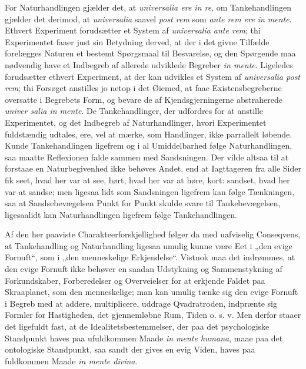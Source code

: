 \documentclass[11pt]{book}
\newcommand{\opage}[1]{\marginnote{\footnotesize\textit{[#1]}}}
\begin{document}
For Naturhandlingen gjælder det, at \textit{universalia ere in re}, om
Tankehandlingen gjælder det derimod, at \textit{universalia} saavel
\textit{post rem} som \textit{ante rem ere in mente}. Ethvert
Experiment forudsætter et System af \textit{universalia ante rem}; thi
Experimentet faaer just sin Betydning derved, at der i
\opage{212} \setcounter{footnote}{0}%
det givne Tilfælde forelægges Naturen et bestemt Spørgsmaal til
Besvarelse, og den Spørgende maa nødvendig have et Indbegreb af
allerede udviklede Begreber \textit{in mente}. Ligeledes forudsætter
ethvert Experiment, at der kan udvikles et System af
\textit{universalia post rem}; thi Forsøget anstilles jo netop i det
Øiemed, at faae Existensbegreberne oversatte i Begrebets Form, og
bevare de af Kjendsgjerningerne abstraherede \textit{univer\-%
salia in mente}. De Tankehandlinger, der udfordres for at anstille
Experimentet, og det Indbegreb af Naturhandlinger, hvori Experimentet
fuldstændig udtales, ere, vel at mærke, som Handlinger, ikke parrallelt
løbende.
Kunde Tankehandlingen ligefrem og i al Umiddelbarhed følge
Naturhandlingen, saa maatte Reflexionen falde sammen med Sandsningen.
Der vilde altsaa til at forstaae en Naturbegivenhed ikke behøves Andet,
end at Iagttageren fra alle Sider fik seet, hvad her var at see, hørt,
hvad her var at høre, kort: sandset, hvad her var at sandse; men
ligesaa lidt som Sandsningen ligefrem kan følge Tænkningen, saa at
Sandsebevægelsen Punkt for Punkt skulde svare til Tankebevægelsen,
ligesaalidt kan Naturhandlingen ligefrem følge Tankehandlingen.

Af den her paaviste Charakteerforskjellighed følger da med uafviselig
Conseqvens, at Tankehandling og Naturhandling ligesaa umulig kunne være
Eet i „den evige Fornuft“, som i „den menneskelige Erkjendelse“.
Vistnok maa det indrømmes, at den evige Fornuft ikke behøver en saadan
Udstykning og Sammenstykning af Forkundskaber, Forberedelser og
Overveielser for at erkjende Faldet paa Skraaplanet, som den
menneskelige; man kan umulig tænke sig den evige Fornuft i Begreb med
at addere, multiplicere, uddrage Qvadratroden, indprænte sig Formler
for Hastigheden, det gjennemløbne Rum, Tiden o. s. v. Men derfor staaer
det ligefuldt fast, at de Idealitetsbestemmelser, der paa det
psychologiske Standpunkt haves paa ufuldkommen Maade \textit{in mente
humana}, maae
\opage{213} \setcounter{footnote}{0}%
paa det ontologiske Standpunkt, saa sandt der gives en evig Viden,
haves paa fuldkommen Maade \textit{in mente divina}.
\end{document}
